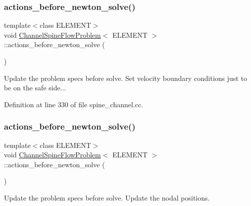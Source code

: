 \subsubsection{\texorpdfstring{actions\+\_\+before\+\_\+newton\+\_\+solve()}{actions\_before\_newton\_solve()}\hspace{0.1cm}{\footnotesize\ttfamily [1/2]}}
{\footnotesize\ttfamily template$<$class E\+L\+E\+M\+E\+NT$>$ \\
void \hyperlink{classChannelSpineFlowProblem}{Channel\+Spine\+Flow\+Problem}$<$ E\+L\+E\+M\+E\+NT $>$\+::actions\+\_\+before\+\_\+newton\+\_\+solve (\begin{DoxyParamCaption}{ }\end{DoxyParamCaption})\hspace{0.3cm}{\ttfamily [inline]}}



Update the problem specs before solve. Set velocity boundary conditions just to be on the safe side... 



Definition at line 330 of file spine\+\_\+channel.\+cc.

\mbox{\label{classChannelSpineFlowProblem_aaf6dd8a8a472ccd938df579aba61ec97}} 
\subsubsection{\texorpdfstring{actions\+\_\+before\+\_\+newton\+\_\+solve()}{actions\_before\_newton\_solve()}\hspace{0.1cm}{\footnotesize\ttfamily [2/2]}}
{\footnotesize\ttfamily template$<$class E\+L\+E\+M\+E\+NT$>$ \\
void \hyperlink{classChannelSpineFlowProblem}{Channel\+Spine\+Flow\+Problem}$<$ E\+L\+E\+M\+E\+NT $>$\+::actions\+\_\+before\+\_\+newton\+\_\+solve (\begin{DoxyParamCaption}{ }\end{DoxyParamCaption})\hspace{0.3cm}{\ttfamily [inline]}}



Update the problem specs before solve. Update the nodal positions. 



